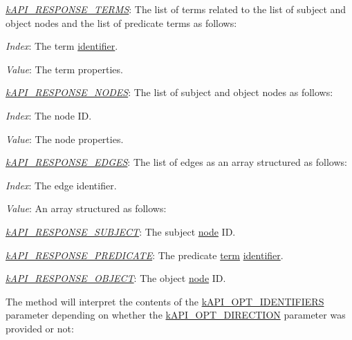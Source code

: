 \begin{DoxyItemize}
\item {\itshape \hyperlink{}{k\-A\-P\-I\-\_\-\-R\-E\-S\-P\-O\-N\-S\-E\-\_\-\-T\-E\-R\-M\-S}}\-: The list of terms related to the list of subject and object nodes and the list of predicate terms as follows\-: 
\begin{DoxyItemize}
\item {\itshape Index}\-: The term \hyperlink{}{identifier}. 
\item {\itshape Value}\-: The term properties. 
\end{DoxyItemize}
\item {\itshape \hyperlink{}{k\-A\-P\-I\-\_\-\-R\-E\-S\-P\-O\-N\-S\-E\-\_\-\-N\-O\-D\-E\-S}}\-: The list of subject and object nodes as follows\-: 
\begin{DoxyItemize}
\item {\itshape Index}\-: The node I\-D. 
\item {\itshape Value}\-: The node properties. 
\end{DoxyItemize}
\item {\itshape \hyperlink{}{k\-A\-P\-I\-\_\-\-R\-E\-S\-P\-O\-N\-S\-E\-\_\-\-E\-D\-G\-E\-S}}\-: The list of edges as an array structured as follows\-: 
\begin{DoxyItemize}
\item {\itshape Index}\-: The edge identifier. 
\item {\itshape Value}\-: An array structured as follows\-: 
\begin{DoxyItemize}
\item {\itshape \hyperlink{}{k\-A\-P\-I\-\_\-\-R\-E\-S\-P\-O\-N\-S\-E\-\_\-\-S\-U\-B\-J\-E\-C\-T}}\-: The subject \hyperlink{class_c_ontology_node}{node} I\-D. 
\item {\itshape \hyperlink{}{k\-A\-P\-I\-\_\-\-R\-E\-S\-P\-O\-N\-S\-E\-\_\-\-P\-R\-E\-D\-I\-C\-A\-T\-E}}\-: The predicate \hyperlink{class_c_ontology_term}{term} \hyperlink{}{identifier}. 
\item {\itshape \hyperlink{}{k\-A\-P\-I\-\_\-\-R\-E\-S\-P\-O\-N\-S\-E\-\_\-\-O\-B\-J\-E\-C\-T}}\-: The object \hyperlink{class_c_ontology_node}{node} I\-D. 
\end{DoxyItemize}
\end{DoxyItemize}
\end{DoxyItemize}

The method will interpret the contents of the \hyperlink{}{k\-A\-P\-I\-\_\-\-O\-P\-T\-\_\-\-I\-D\-E\-N\-T\-I\-F\-I\-E\-R\-S} parameter depending on whether the \hyperlink{}{k\-A\-P\-I\-\_\-\-O\-P\-T\-\_\-\-D\-I\-R\-E\-C\-T\-I\-O\-N} parameter was provided or not\-:



